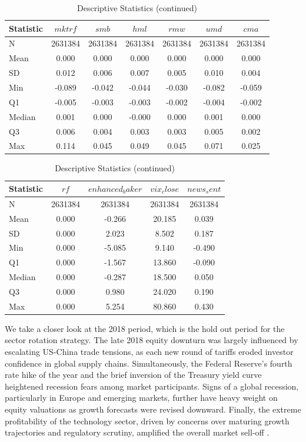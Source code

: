 \begin{table}[ht]
\centering
\caption{Descriptive Statistics (continued)}
\label{tab:descr_stats2}
\begin{tabular}{lcccccc}
\toprule
Statistic & $mktrf$ & $smb$ & $hml$ & $rmw$ & $umd$ & $cma$ \\\midrule
N & 2631384 & 2631384 & 2631384 & 2631384 & 2631384 & 2631384 \\
Mean & 0.000 & 0.000 & 0.000 & 0.000 & 0.000 & 0.000 \\
SD & 0.012 & 0.006 & 0.007 & 0.005 & 0.010 & 0.004 \\
Min & -0.089 & -0.042 & -0.044 & -0.030 & -0.082 & -0.059 \\
Q1 & -0.005 & -0.003 & -0.003 & -0.002 & -0.004 & -0.002 \\
Median & 0.001 & 0.000 & -0.000 & 0.000 & 0.001 & 0.000 \\
Q3 & 0.006 & 0.004 & 0.003 & 0.003 & 0.005 & 0.002 \\
Max & 0.114 & 0.045 & 0.049 & 0.045 & 0.071 & 0.025 \\
\bottomrule
\end{tabular}
\end{table}

\begin{table}[ht]
\centering
\caption{Descriptive Statistics (continued)}
\label{tab:descr_stats3}

\begin{tabular}{lcccc}
\toprule
Statistic & $rf$ & $enhanced_baker$ & $vix_close$ & $news_sent$ \\\midrule
N & 2631384 & 2631384 & 2631384 & 2631384 \\
Mean & 0.000 & -0.266 & 20.185 & 0.039 \\
SD & 0.000 & 2.023 & 8.502 & 0.187 \\
Min & 0.000 & -5.085 & 9.140 & -0.490 \\
Q1 & 0.000 & -1.567 & 13.860 & -0.090 \\
Median & 0.000 & -0.287 & 18.500 & 0.050 \\
Q3 & 0.000 & 0.980 & 24.020 & 0.190 \\
Max & 0.000 & 5.254 & 80.860 & 0.430 \\
\bottomrule
\end{tabular}
\end{table}

We take a closer look at the 2018 period, which is the hold out period for the sector rotation strategy. The late 2018 equity downturn was largely influenced by escalating US-China trade tensions, as each new round of tariffs eroded investor confidence in global supply chains. Simultaneously, the Federal Reserve's fourth rate hike of the year and the brief inversion of the Treasury yield curve heightened recession fears among market participants. Signs of a global recession, particularly in Europe and emerging markets, further have heavy weight on equity valuations as growth forecasts were revised downward. Finally, the extreme profitability of the technology sector, driven by concerns over maturing growth trajectories and regulatory scrutiny, amplified the overall market sell-off \cite{reuters_2018}.

